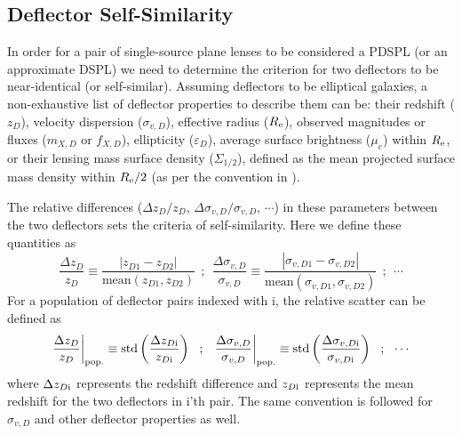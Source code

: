 \documentclass[a4paper,11pt]{article}
\begin{document}
\subsection{Deflector Self-Similarity}
In order for a pair of single-source plane lenses to be considered a PDSPL (or an approximate DSPL) we need to determine the criterion for two deflectors to be near-identical (or self-similar). Assuming deflectors to be elliptical galaxies, a non-exhaustive list of deflector properties to describe them can be: their redshift ($z_D$), velocity dispersion (${\sigma_{v, D}}$), effective radius (${R_{\rm e}}$), observed magnitudes or fluxes (${m_{X,D}}$ or ${f_{X,D}}$), ellipticity (${\varepsilon}_{D}$), average surface brightness ($\mu_e$) within ${R_{\rm e}}$, or their lensing mass surface density ($\Sigma_{1/2}$), defined as the mean projected surface mass density within $R_{\rm e}/2$ (as per the convention in \cite{Auger:2010, Mozumdar:2025}).

The relative differences (${\Delta z_D / z_D}$, ${\Delta \sigma_{v, D}/\sigma_{v, D}}$, $\cdots$) in these parameters between the two deflectors sets the criteria of self-similarity. Here we define these quantities as
\begin{equation}\label{eqn:rel_scatter_deflector_params}
    \frac{\Delta z_D}{z_D} \equiv \frac{|z_{D1} - z_{D2}|}{\text{mean}(z_{D1}, z_{D2})} \ \ ; \ \ \frac{\Delta \sigma_{v, D}}{\sigma_{v, D}} \equiv \frac{|\sigma_{v, D1} - \sigma_{v, D2}|}{\text{mean}(\sigma_{v, D1}, \sigma_{v, D2})} \ \ ; \ \ \cdots
\end{equation}
For a population of deflector pairs indexed with i, the relative scatter can be defined as
\begin{equation}\label{eqn:rel_scatter_deflector_params_population}
    \left.\frac{\Delta z_D}{z_D}\right|_{\rm pop.} \equiv \text{std}\left(\frac{\Delta z_{D\rm i}}{z_{D\rm i}}\right) \ \ ; \ \ \left.\frac{\Delta \sigma_{v, D}}{\sigma_{v, D}}\right|_{\rm pop.} \equiv \text{std}\left(\frac{\Delta \sigma_{v, D\rm i}}{\sigma_{v, D\rm i}}\right)\ \ ; \ \ \cdots
\end{equation}
where $\Delta z_{D\rm i}$ represents the redshift difference and $z_{D\rm i}$ represents the mean redshift for the two deflectors in i'th pair. The same convention is followed for $\sigma_{v, D}$ and other deflector properties as well. 
\end{document}

